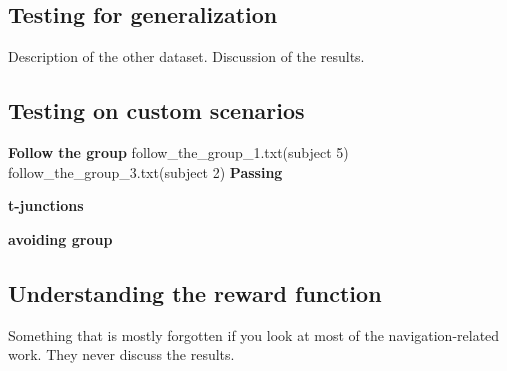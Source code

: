 \subsection*{Testing for generalization}
Description of the other dataset.
Discussion of the results.
\subsection*{Testing on custom scenarios}
\textbf{Follow the group}
follow\_the\_group\_1.txt(subject 5)
follow\_the\_group\_3.txt(subject 2)
\textbf{Passing}

\textbf{t-junctions}

\textbf{avoiding group}

\subsection*{Understanding the reward function}
Something that is mostly forgotten if you look at most of the navigation-related work. They never discuss the results.
